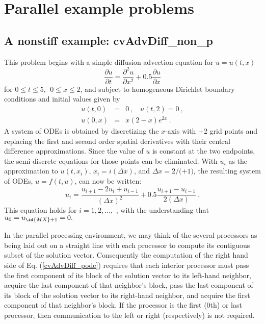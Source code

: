 \section{Parallel example problems}\label{s:ex_parallel}

\subsection{A nonstiff example: cvAdvDiff\_non\_p}\label{ss:cvAdvDiff_p}

This problem begins with a simple diffusion-advection equation
for $u=u(t,x)$
\begin{equation}
\frac{\partial u}{\partial t}=\frac{\partial ^{2}u}{\partial x^{2}}
   + 0.5\frac{\partial u}{\partial x}  \label{PDE1}
\end{equation}
for $0 \leq t \leq 5, ~~ 0\leq x \leq 2$, and subject to homogeneous
Dirichlet boundary conditions and initial values given by 
\begin{eqnarray}
u(t,0) &=& 0 ~,~~~~u(t,2) = 0 ~, \label{BCIC1} \\
u(0,x) &=& x(2-x)e^{2x} ~. \nonumber
\end{eqnarray}
A system of  ODEs is obtained by discretizing the $x$-axis with +2
grid points and replacing the first and second order spatial derivatives
with their central difference approximations. Since the value of $u$ is
constant at the two endpoints, the semi-discrete equations for those points
can be eliminated.  With $u_{i}$ as the approximation to $u(t,x_{i})$, 
$x_{i} = i(\Delta x)$, and $\Delta x = 2/($$+1)$, the resulting system of
ODEs, $\dot{u} = f(t,u)$, can now be written:
\begin{equation}
\dot{u}_i=\frac{u_{i+1}-2u_{i}+u_{i-1}}{(\Delta x)^{2}}
  + 0.5 \frac{u_{i+1}-u_{i-1}}{2(\Delta x)} ~. \label{cvAdvDiff_pode}
\end{equation}
This equation holds for $i=1,2,\ldots ,$ , with the understanding
that $u_{0} = u_{\id{MX}+1}=0.$

In the parallel processing environment, we may think of the several
processors as being laid out on a straight line with each processor to
compute its contiguous subset of the solution vector.  Consequently
the computation of the right hand side of Eq. (\ref{cvAdvDiff_pode}) requires
that each interior processor must pass the first component of its block of
the solution vector to its left-hand neighbor, acquire the last component of
that neighbor's block, pass the last component of its block of the solution
vector to its right-hand neighbor, and acquire the first component of that
neighbor's block. If the processor is the first ($0$th) or last processor,
then communication to the left or right (respectively) is not required.

